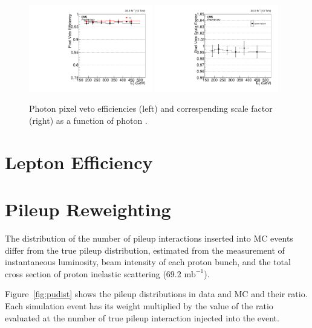 \begin{figure}[htbp]
  \begin{center}
    \includegraphics[width=0.48\textwidth]{Calibration/Figures/pvsf/efficiency_barrel_medium.pdf}
    \includegraphics[width=0.48\textwidth]{Calibration/Figures/pvsf/scalefactor_barrel_medium.pdf}
    \caption{
      Photon pixel veto efficiencies (left) and correspending scale factor (right) as a function of photon \pt.
    }
    \label{fig:pvsf_results}
  \end{center}
\end{figure}

\section{Lepton Efficiency}
\label{sec:lepton_eff}

\section{Pileup Reweighting}
\label{sec:puweight}

The distribution of the number of pileup interactions inserted into MC events differ from the true pileup distribution, estimated from the measurement of instantaneous luminosity, beam intensity of each proton bunch, and the total cross section of proton inelastic scattering (69.2 $\textrm{mb}^{-1}$).

Figure~\ref{fig:pudist} shows the pileup distributions in data and MC and their ratio. 
Each simulation event has its weight multiplied by the value of the ratio evaluated at the number of true pileup interaction injected into the event.


